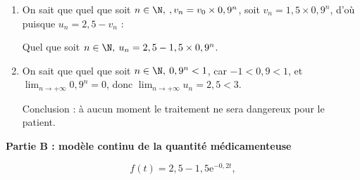 \begin{enumerate}
\begin{enumerate}
		Or $v_n = 2,5 - u_n \iff u_n = 2,5 - v_n$ ; l'égalité précédente devient donc :
		
		$2,5 - v_{n+1} = 0,9\left(2,5 - v_n \right) + 0,25 \iff 2,5 - v_{n+1} = 2,25 - 0,9v_n + 0,25 \iff v_{n+1} = 0,9v_n$ : cette égalité montre que la suite $\left(v_n\right)$ est une suite géométrique de raison 0,9 de premier terme $v_0 = 2,5 - u_0 = 2,5 - 1 = 1,5$.
		\item %
		On sait que quel que soit $n \in \N,\:, v_n = v_0 \times 0,9^n$, soit $v_n = 1,5 \times 0,9^n$, d'où puisque $u_n = 2,5 - v_n$ :
		
Quel que soit $n \in \N, \: u_n = 2,5 - 1,5 \times 0,9^n$.
		\item %
		
On sait que quel que soit $n \in \N, \: 0,9^n < 1$, car $-1 < 0,9 < 1$, et $\displaystyle\lim_{n \to + \infty} 0,9^n = 0$, donc $\displaystyle\lim_{n \to + \infty}u_n =2,5 < 3$.

Conclusion : à aucun moment le traitement ne sera dangereux pour le patient.
	\end{enumerate}
\end{enumerate}

\bigskip

\textbf{Partie B : modèle continu de la quantité médicamenteuse}

\medskip

%
%

\[f(t) = 2,5 - 1,5\text{e}^{-0,2t},\]

